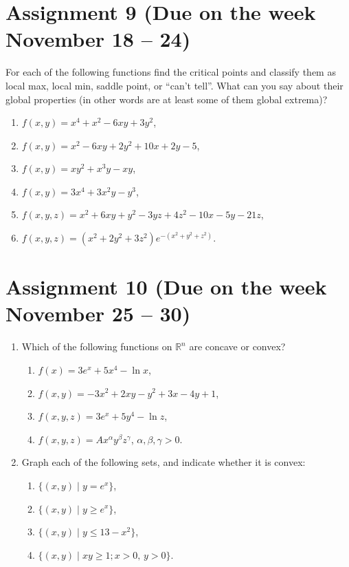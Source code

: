 \documentclass[12pt]{article} %
\theoremstyle{definition} %
\newcommand{\R}{\mathbb{R}}
\begin{document}
\section*{Assignment 9 (Due on the week November 18 – 24)}


For each of the following functions find the critical points and classify them as local max, local min, saddle point, or ``can't tell''. What can you say about their global properties (in other words are at least some of them global extrema)?

\begin{enumerate}
\item $f(x,y)=x^4+x^2-6xy+3y^2$,
\item $f(x,y)=x^2-6xy+2y^2+10x+2y-5$,
\item $f(x,y)=xy^2+x^3y-xy$,
\item $f(x,y)=3x^4+3x^2y-y^3$,
\item $f(x,y, z)=x^2+6xy+y^2-3yz+4z^2-10x-5y-21z$,
\item $f(x,y,z)=(x^2+2y^2+3z^2)e^{-(x^2+y^2+z^2)}$.
\end{enumerate}




\section*{Assignment 10 (Due on the week November 25 – 30)}

\begin{enumerate}
\item Which of the following functions on $\R^n$ are concave or convex?
\begin{enumerate}
\item $f(x)=3e^x+5x^4-\ln x$,
\item $f(x, y)=-3x^2+2xy-y^2+3x-4y+1$,
\item $f(x,y,z)=3e^x+5y^4-\ln z$,
\item $f(x,y,z)=Ax^\alpha y^\beta z^\gamma$, $\alpha,\beta,\gamma>0$.
\end{enumerate}
\item Graph each of the following sets, and indicate whether it is convex:
\begin{enumerate}
\item $\{(x,y)\;|\; y=e^x\}$,
\item $\{(x,y)\;|\; y\geq e^x\}$,
\item $\{(x,y)\;|\;y\leq 13-x^2\}$,
\item $\{(x,y)\;|\; xy\geq 1; x>0,\, y>0\}$.
\end{enumerate}
\end{enumerate}
\end{document}
